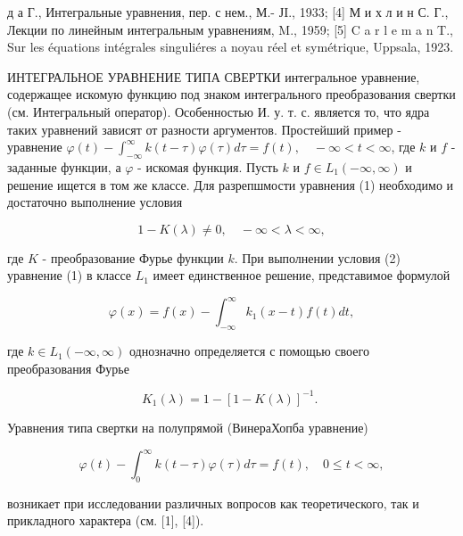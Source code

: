 \documentclass[10pt]{article}
\begin{document}
д а Г., Интегральные уравнения, пер. с нем., М.- ЈI., 1933; [4] М и х л и н С. Г., Лекции по линейным интегральным уравнениям, M., 1959; [5] C a r l e m a n T., Sur les équations intégrales singuliéres a noyau réel et symétrique, Uppsala, 1923.



ИНТЕГРАЛЬНОЕ УРАВНЕНИЕ ТИПА СВЕРТКИ интегральное уравнение, содержащее искомую функцию под знаком интегрального преобразования свертки (см. Интегральный оператор). Особенностью И. у. т. с. является то, что ядра таких уравнений зависят от разности аргументов. Простейший пример - уравнение $\varphi(t)-\int_{-\infty}^{\infty} k(t-\tau) \varphi(\tau) d \tau=f(t), \quad-\infty<t<\infty$, где $k$ и $f$ - заданные функции, а $\varphi$ - искомая функция. Пусть $k$ и $f \in L_{1}(-\infty, \infty)$ и решение ищется в том же классе. Для разрепшмости уравнения (1) необходимо и достаточно выполнение условия



\[

1-K(\lambda) \neq 0, \quad-\infty<\lambda<\infty,

\]



где $K$ - преобразование Фурье функции $k$. При выполнении условия (2) уравнение (1) в классе $L_{1}$ имеет единственное решение, представимое формулой



\[

\varphi(x)=f(x)-\int_{-\infty}^{\infty} k_{1}(x-t) f(t) d t,

\]



где $k \in L_{1}(-\infty, \infty)$ однозначно определяется с помощью своего преобразования Фурье



\[

K_{1}(\lambda)=1-[1-K(\lambda)]^{-1} \text {. }

\]



Уравнения типа свертки на полупрямой (ВинераХопба уравнение)



\[

\varphi(t)-\int_{0}^{\infty} k(t-\tau) \varphi(\tau) d \tau=f(t), \quad 0 \leqslant t<\infty,

\]



возникает при исследовании различных вопросов как теоретического, так и прикладного характера (см. [1], [4]).
\end{document}
